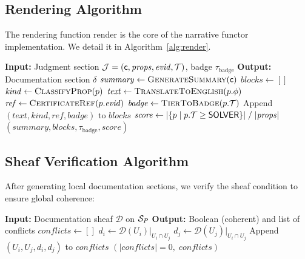 \documentclass[11pt]{article}
\newcommand{\DocSheaf}{\mathcal{D}}
\newcommand{\DocSection}{\delta}
\newcommand{\TrustBadge}{\tau_{\mathrm{badge}}}
\newcommand{\RenderFunc}{\mathrm{render}}
\begin{document}
\subsection{Rendering Algorithm}

The rendering function $\RenderFunc$ is the core of the narrative
functor implementation.  We detail it in Algorithm~\ref{alg:render}.

\begin{algorithm}[H]
\caption{Rendering Function $\RenderFunc$}
\label{alg:render}
\begin{algorithmic}[1]
\STATE \textbf{Input:} Judgment section $\mathcal{J} = (\mathsf{c}, \mathit{props},
       \mathit{evid}, \mathcal{T})$, badge $\TrustBadge$
\STATE \textbf{Output:} Documentation section $\DocSection$
\STATE $\mathit{summary} \gets \textsc{GenerateSummary}(\mathsf{c})$
\STATE $\mathit{blocks} \gets []$
  \STATE $\mathit{kind} \gets \textsc{ClassifyProp}(p)$
  \STATE $\mathit{text} \gets \textsc{TranslateToEnglish}(p.\phi)$
  \STATE $\mathit{ref} \gets \textsc{CertificateRef}(p.\mathit{evid})$
  \STATE $\mathit{badge} \gets \textsc{TierToBadge}(p.\mathcal{T})$
  \STATE Append $(\mathit{text}, \mathit{kind}, \mathit{ref},
         \mathit{badge})$ to $\mathit{blocks}$
\ENDFOR
\STATE $\mathit{score} \gets |\{p \mid p.\mathcal{T} \geq \mathsf{SOLVER}\}|
       \;/\; |\mathit{props}|$
\RETURN $(\mathit{summary}, \mathit{blocks}, \TrustBadge,
         \mathit{score})$
\end{algorithmic}
\end{algorithm}

\subsection{Sheaf Verification Algorithm}

After generating local documentation sections, we verify the sheaf
condition to ensure global coherence:

\begin{algorithm}[H]
\caption{Sheaf Condition Verification for $\DocSheaf$}
\label{alg:sheaf-verify}
\begin{algorithmic}[1]
\STATE \textbf{Input:} Documentation sheaf $\DocSheaf$ on $\mathcal{S}_P$
\STATE \textbf{Output:} Boolean (coherent) and list of conflicts
\STATE $\mathit{conflicts} \gets []$
    \STATE $d_i \gets \DocSheaf(U_i)|_{U_i \cap U_j}$
    \STATE $d_j \gets \DocSheaf(U_j)|_{U_i \cap U_j}$
      \STATE Append $(U_i, U_j, d_i, d_j)$ to $\mathit{conflicts}$
    \ENDIF
  \ENDFOR
\ENDFOR
\RETURN $(|\mathit{conflicts}| = 0, \;\mathit{conflicts})$
\end{algorithmic}
\end{algorithm}
\end{document}
